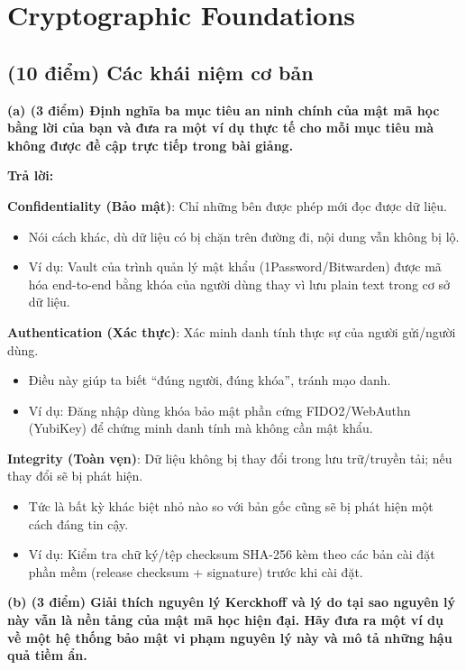 \section{Cryptographic Foundations}

\subsection{(10 điểm) Các khái niệm cơ bản}

\textbf{(a) (3 điểm) Định nghĩa ba mục tiêu an ninh chính của mật mã học bằng lời của bạn và đưa ra một ví dụ thực tế cho mỗi mục tiêu mà không được đề cập trực tiếp trong bài giảng.}

\begin{center}
\textbf{Trả lời:}
\end{center}

\textbf{Confidentiality (Bảo mật)}: Chỉ những bên được phép mới đọc được dữ liệu.
\begin{itemize}
    \item Nói cách khác, dù dữ liệu có bị chặn trên đường đi, nội dung vẫn không bị lộ.
    \item Ví dụ: Vault của trình quản lý mật khẩu (1Password/Bitwarden) được mã hóa end-to-end bằng khóa của người dùng thay vì lưu plain text trong cơ sở dữ liệu.
\end{itemize}

\textbf{Authentication (Xác thực)}: Xác minh danh tính thực sự của người gửi/người dùng.
\begin{itemize}
    \item Điều này giúp ta biết ``đúng người, đúng khóa'', tránh mạo danh.
    \item Ví dụ: Đăng nhập dùng khóa bảo mật phần cứng FIDO2/WebAuthn (YubiKey) để chứng minh danh tính mà không cần mật khẩu.
\end{itemize}

\textbf{Integrity (Toàn vẹn)}: Dữ liệu không bị thay đổi trong lưu trữ/truyền tải; nếu thay đổi sẽ bị phát hiện.
\begin{itemize}
    \item Tức là bất kỳ khác biệt nhỏ nào so với bản gốc cũng sẽ bị phát hiện một cách đáng tin cậy.
    \item Ví dụ: Kiểm tra chữ ký/tệp checksum SHA-256 kèm theo các bản cài đặt phần mềm (release checksum + signature) trước khi cài đặt.
\end{itemize}

\textbf{(b) (3 điểm) Giải thích nguyên lý Kerckhoff và lý do tại sao nguyên lý này vẫn là nền tảng của mật mã học hiện đại. Hãy đưa ra một ví dụ về một hệ thống bảo mật vi phạm nguyên lý này và mô tả những hậu quả tiềm ẩn.}

